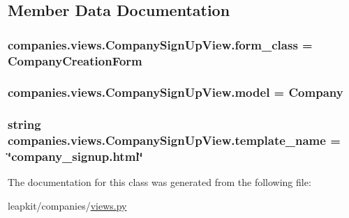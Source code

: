 \subsection{Member Data Documentation}
\hypertarget{classcompanies_1_1views_1_1_company_sign_up_view_a9b505d26211824ceae6cc1097cd70bb3}{
\subsubsection[{form\-\_\-class}]{\setlength{\rightskip}{0pt plus 5cm}companies.\-views.\-Company\-Sign\-Up\-View.\-form\-\_\-class = Company\-Creation\-Form\hspace{0.3cm}{\ttfamily [static]}}}\label{classcompanies_1_1views_1_1_company_sign_up_view_a9b505d26211824ceae6cc1097cd70bb3}
\hypertarget{classcompanies_1_1views_1_1_company_sign_up_view_a0f898ec1c715cc970724de95908e90dc}{
\subsubsection[{model}]{\setlength{\rightskip}{0pt plus 5cm}companies.\-views.\-Company\-Sign\-Up\-View.\-model = Company\hspace{0.3cm}{\ttfamily [static]}}}\label{classcompanies_1_1views_1_1_company_sign_up_view_a0f898ec1c715cc970724de95908e90dc}
\hypertarget{classcompanies_1_1views_1_1_company_sign_up_view_a0faf2d2f999fb9eab072f43d6c902037}{
\subsubsection[{template\-\_\-name}]{\setlength{\rightskip}{0pt plus 5cm}string companies.\-views.\-Company\-Sign\-Up\-View.\-template\-\_\-name = \char`\"{}company\-\_\-signup.\-html\char`\"{}\hspace{0.3cm}{\ttfamily [static]}}}\label{classcompanies_1_1views_1_1_company_sign_up_view_a0faf2d2f999fb9eab072f43d6c902037}


The documentation for this class was generated from the following file\-:\begin{DoxyCompactItemize}
\item 
leapkit/companies/\hyperlink{companies_2views_8py}{views.\-py}\end{DoxyCompactItemize}

